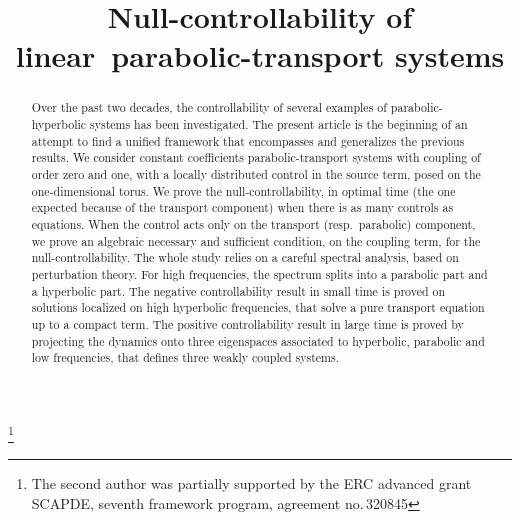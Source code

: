 \documentclass[JEP,XML,SOM,Unicode,NoEqCountersInSection]{cedram}
\theoremstyle{plain}
\theoremstyle{definition}
\theoremstyle{remark}
\begin{document}
\frontmatter
\title{Null-controllability of linear~parabolic-transport systems}

\author[\initial{K.} \lastname{Beauchard}]{ }
\address{Univ Rennes, CNRS, IRMAR - UMR 6625\\
F-35000 Rennes, France}

\author[\initial{A.} \lastname{Koenig}]{ }
\address{Université Côte d'Azur, CNRS, LJAD, France}

\author[\initial{K.} \lastname{Le Balc'h}]{ }
\address{Univ Rennes, CNRS, IRMAR - UMR 6625\\
F-35000 Rennes, France}

\thanks{The second author was partially supported by the ERC advanced grant SCAPDE, seventh framework program, agreement no.\,320845}

\begin{abstract}
Over the past two decades, the controllability of several examples of parabolic-hyperbolic systems has been investigated. The present article is the beginning of an attempt to find a unified framework that encompasses and generalizes the previous results.
We consider constant coefficients parabolic-transport systems with coupling of order zero and one, with a locally distributed control in the source term, posed on the one-dimensional torus.
We prove the null-controllability, in optimal time (the one expected because of the transport component) when there is as many controls as equations. When the control acts only on the transport (resp.\ parabolic) component, we prove an algebraic necessary and sufficient condition, on the coupling term, for the null-controllability.
The whole study relies on a careful spectral analysis, based on perturbation theory. For high frequencies, the spectrum splits into a parabolic part and a hyperbolic part. The negative controllability result in small time is proved on solutions localized on high hyperbolic frequencies, that solve a pure transport equation up to a compact term. The positive controllability result in large time is proved by projecting the dynamics onto three eigenspaces associated to hyperbolic, parabolic and low frequencies, that defines three weakly coupled systems.
\end{abstract}
\end{document}
